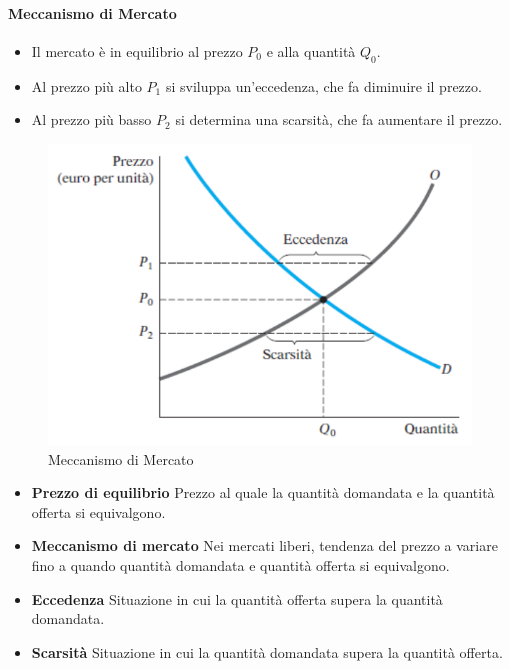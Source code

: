 \documentclass[12pt]{article}
\begin{document}
\paragraph{Meccanismo di Mercato}
\begin{itemize}
    \item Il mercato è in equilibrio al prezzo $P_0$ e alla quantità $Q_0$.
    \item Al prezzo più alto $P_1$ si sviluppa un’eccedenza, che fa diminuire il prezzo.
    \item Al prezzo più basso $P_2$ si determina una scarsità, che fa aumentare il prezzo.
\end{itemize}
\FloatBarrier
\begin{figure}[!htb]
    \centering
    \includegraphics[width=1\textwidth]{images/mercato.png}
    \caption{Meccanismo di Mercato}
\end{figure}
\begin{itemize}
    \item \textbf{Prezzo di equilibrio} Prezzo al quale la quantità domandata e la quantità offerta si equivalgono.
    \item \textbf{Meccanismo di mercato} Nei mercati liberi, tendenza del prezzo a variare fino a quando quantità domandata e quantità offerta si equivalgono.
    \item \textbf{Eccedenza} Situazione in cui la quantità offerta supera la quantità domandata.
    \item \textbf{Scarsità} Situazione in cui la quantità domandata supera la quantità offerta.
\end{itemize}
\newpage
\end{document}
